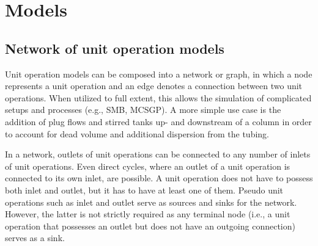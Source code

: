%  
%  

\chapter{Models}

%

\section{Network of unit operation models}\label{sec:MUOPNetwork}

Unit operation models can be composed into a network  or graph, in which a node represents a unit operation and an edge denotes a connection between two unit operations.
When utilized to full extent, this allows the simulation of complicated setups and processes (e.g., SMB, MCSGP).
A more simple use case is the addition of plug flows and stirred tanks up- and downstream of a column in order to account for dead volume and additional dispersion from the tubing.

In a network, outlets of unit operations can be connected to any number of inlets of unit operations.
Even direct cycles, where an outlet of a unit operation is connected to its own inlet, are possible.
A unit operation does not have to possess both inlet and outlet, but it has to have at least one of them.
Pseudo unit operations such as inlet and outlet serve as sources and sinks for the network.
However, the latter is not strictly required as any terminal node (i.e., a unit operation that possesses an outlet but does not have an outgoing connection) serves as a sink.

